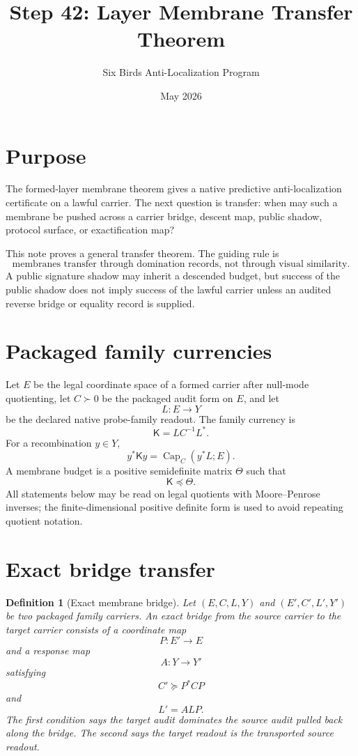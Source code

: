 \documentclass[11pt]{article}
\title{Step 42: Layer Membrane Transfer Theorem}
\author{Six Birds Anti-Localization Program}
\date{May 2026}
\newtheorem{definition}[theorem]{Definition}
\newcommand{\K}{\mathsf K}
\renewcommand{\Cap}{\operatorname{Cap}}
\newcommand{\pre}{\preceq}
\newcommand{\suc}{\succeq}
\begin{document}
\maketitle

\section{Purpose}
The formed-layer membrane theorem gives a native predictive anti-localization certificate on a lawful carrier. The next question is transfer: when may such a membrane be pushed across a carrier bridge, descent map, public shadow, protocol surface, or exactification map?

This note proves a general transfer theorem. The guiding rule is
\[
\boxed{\text{membranes transfer through domination records, not through visual similarity.}}
\]
A public signature shadow may inherit a descended budget, but success of the public shadow does not imply success of the lawful carrier unless an audited reverse bridge or equality record is supplied.

\section{Packaged family currencies}
Let \(E\) be the legal coordinate space of a formed carrier after null-mode quotienting, let \(C\succ0\) be the packaged audit form on \(E\), and let
\[
L:E\to Y
\]
be the declared native probe-family readout. The family currency is
\[
\K=LC^{-1}L^*.
\]
For a recombination \(y\in Y\),
\[
y^*\K y=\Cap_C(y^*L;E).
\]
A membrane budget is a positive semidefinite matrix \(\Theta\) such that
\[
\K\pre \Theta.
\]
All statements below may be read on legal quotients with Moore--Penrose inverses; the finite-dimensional positive definite form is used to avoid repeating quotient notation.

\section{Exact bridge transfer}
\begin{definition}[Exact membrane bridge]
Let \((E,C,L,Y)\) and \((E',C',L',Y')\) be two packaged family carriers. An exact bridge from the source carrier to the target carrier consists of a coordinate map
\[
P:E'\to E
\]
and a response map
\[
A:Y\to Y'
\]
satisfying
\[
C'\suc P^*CP
\]
and
\[
L'=ALP.
\]
The first condition says the target audit dominates the source audit pulled back along the bridge. The second says the target readout is the transported source readout.
\end{definition}
\end{document}
